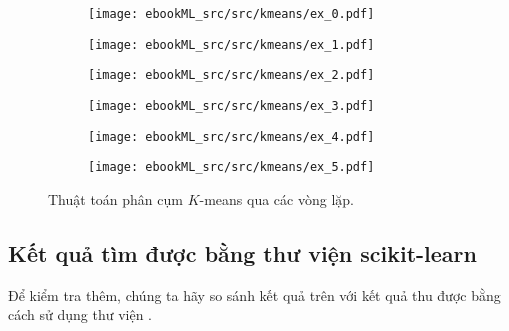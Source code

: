 
\begin{figure}[t]
\begin{subfigure}{0.325\textwidth}
\texttt{[image: ebookML\_src/src/kmeans/ex\_0.pdf]}
\end{subfigure}
\begin{subfigure}{0.325\textwidth}
\texttt{[image: ebookML\_src/src/kmeans/ex\_1.pdf]}
\end{subfigure}
\begin{subfigure}{0.325\textwidth}
\texttt{[image: ebookML\_src/src/kmeans/ex\_2.pdf]}
\end{subfigure}

\begin{subfigure}{0.325\textwidth}
\texttt{[image: ebookML\_src/src/kmeans/ex\_3.pdf]}
\end{subfigure}
\begin{subfigure}{0.325\textwidth}
\texttt{[image: ebookML\_src/src/kmeans/ex\_4.pdf]}
\end{subfigure}
\begin{subfigure}{0.325\textwidth}
\texttt{[image: ebookML\_src/src/kmeans/ex\_5.pdf]}
\end{subfigure}
\caption{
Thuật toán phân cụm $K$-means qua các vòng lặp.
}
\label{fig:4_example}
\end{figure}




\subsection{Kết quả tìm được bằng thư viện scikit-learn}

Để kiểm tra thêm, chúng ta hãy so sánh kết quả trên với kết quả thu được bằng
cách sử dụng thư viện
\href{http://scikit-learn.org/stable/modules/generated/sklearn.cluster.KMeans.html}{}.

